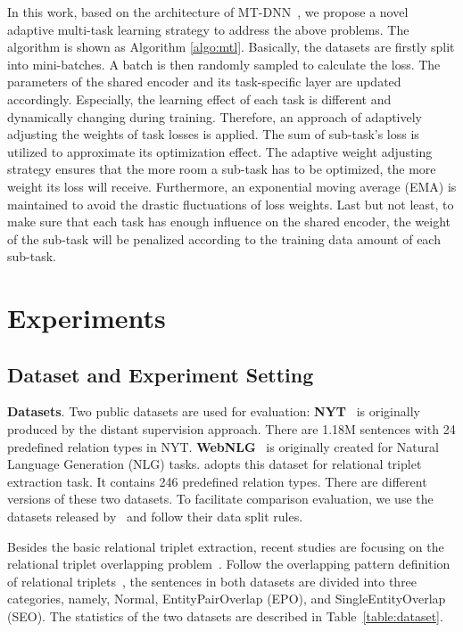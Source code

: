 \documentclass[11pt,a4paper]{article}
\begin{document}
In this work, based on the architecture of MT-DNN~\cite{liu2019multi}, we propose a novel adaptive multi-task learning strategy to address the above problems. The algorithm is shown as Algorithm \ref{algo:mtl}. Basically, the datasets are firstly split into mini-batches. A batch is then randomly sampled to calculate the loss. The parameters of the shared encoder and its task-specific layer are updated accordingly. Especially, the learning effect of each task  is different and dynamically changing during training. Therefore, an approach of adaptively adjusting the weights of task losses is applied. The sum of sub-task's loss  is utilized to approximate its optimization effect. The adaptive weight adjusting strategy ensures that the more room a sub-task has to be optimized, the more weight its loss will receive. Furthermore, an exponential moving average (EMA) \cite{lawrance1977exponential} is maintained to avoid the drastic fluctuations of loss weights. Last but not least, to make sure that each task has enough influence on the shared encoder, the weight of the sub-task will be penalized according to the training data amount of each sub-task.



 \section{Experiments}\subsection{Dataset and Experiment Setting}
\textbf{Datasets}. Two public datasets are used for evaluation: \textbf{NYT}~\cite{riedel2010modeling} is originally produced by the distant supervision approach. There are 1.18M sentences with 24 predeﬁned relation types in NYT. \textbf{WebNLG}~\cite{gardent2017creating} is originally created for Natural Language Generation (NLG) tasks. \cite{zeng2018extracting} adopts this dataset for relational triplet extraction task. It contains 246 predeﬁned relation types. There are different versions of these two datasets. To facilitate comparison evaluation, we use the datasets released by~\cite{zeng2018extracting} and follow their data split rules. 

Besides the basic relational triplet extraction, recent studies are focusing on the relational triplet overlapping problem~\cite{zeng2018extracting,wei2020novel}. Follow the overlapping pattern definition of relational triplets~\cite{zeng2018extracting}, the sentences in both datasets are divided into three categories, namely, Normal, EntityPairOverlap (EPO), and SingleEntityOverlap (SEO). The statistics of the two datasets are described in Table~\ref{table:dataset}. 
\end{document}
